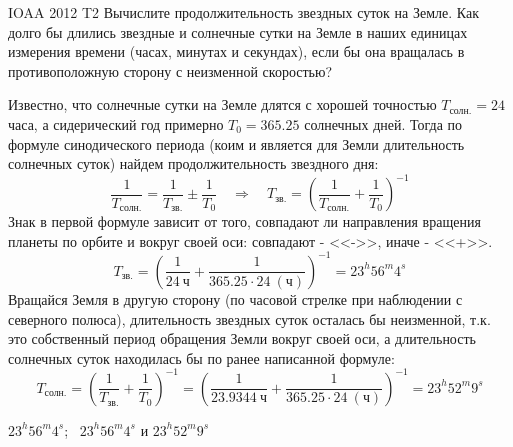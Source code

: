 \begin{problem}{IOAA 2012 T2} 
	Вычислите продолжительность звездных суток на Земле. Как долго бы длились звездные и солнечные сутки на Земле в наших единицах измерения времени (часах, минутах и секундах), если бы она вращалась в противоположную сторону с неизменной скоростью? 

\begin{solution}
	Известно, что солнечные сутки на Земле длятся с хорошей точностью $T_{\text{солн.}}=24$ часа, а сидерический год примерно $T_0=365.25$ солнечных дней. Тогда по формуле синодического периода (коим и является для Земли длительность солнечных суток) найдем продолжительность звездного дня:
    \begin{equation}
        \frac{1}{T_{\text{солн.}}}=\frac{1}{T_{\text{зв.}}}\pm\frac{1}{T_0} \quad\Longrightarrow\quad T_{\text{зв.}}=\left(\frac{1}{T_{\text{солн.}}}+\frac{1}{T_0}\right)^{-1}
    \end{equation}
    Знак в первой формуле зависит от того, совпадают ли направления вращения планеты по орбите и вокруг своей оси: совпадают - <<->>, иначе - <<+>>.
    \begin{equation}
        T_{\text{зв.}}=\left(\frac{1}{24~\text{ч}}+\frac{1}{365.25\cdot 24~(\text{ч})}\right)^{-1}=23^h56^m4^s
    \end{equation}
    Вращайся Земля в другую сторону (по часовой стрелке при наблюдении с северного полюса), длительность звездных суток осталась бы неизменной, т.к. это собственный период обращения Земли вокруг своей оси, а длительность солнечных суток находилась бы по ранее написанной формуле:
    \begin{equation}
        T_{\text{солн.}}=\left(\frac{1}{T_{\text{зв.}}}+\frac{1}{T_0}\right)^{-1}=\left(\frac{1}{23.9344~\text{ч}}+\frac{1}{365.25\cdot 24~(\text{ч})}\right)^{-1}=23^h52^m9^s
    \end{equation}

\end{solution}

\begin{answer}
	$23^h56^m4^s$; \
    $23^h56^m4^s$ и $23^h52^m9^s$
\end{answer}
\end{problem}